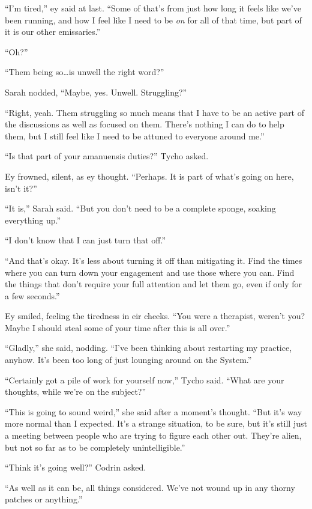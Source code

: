 ``I'm tired,'' ey said at last. ``Some of that's from just how long it feels like we've been running, and how I feel like I need to be \emph{on} for all of that time, but part of it is our other emissaries.''

``Oh?''

``Them being so\ldots is unwell the right word?''

Sarah nodded, ``Maybe, yes. Unwell. Struggling?''

``Right, yeah. Them struggling so much means that I have to be an active part of the discussions as well as focused on them. There's nothing I can do to help them, but I still feel like I need to be attuned to everyone around me.''

``Is that part of your amanuensis duties?'' Tycho asked.

Ey frowned, silent, as ey thought. ``Perhaps. It is part of what's going on here, isn't it?''

``It is,'' Sarah said. ``But you don't need to be a complete sponge, soaking everything up.''

``I don't know that I can just turn that off.''

``And that's okay. It's less about turning it off than mitigating it. Find the times where you can turn down your engagement and use those where you can. Find the things that don't require your full attention and let them go, even if only for a few seconds.''

Ey smiled, feeling the tiredness in eir cheeks. ``You were a therapist, weren't you? Maybe I should steal some of your time after this is all over.''

``Gladly,'' she said, nodding. ``I've been thinking about restarting my practice, anyhow. It's been too long of just lounging around on the System.''

``Certainly got a pile of work for yourself now,'' Tycho said. ``What are your thoughts, while we're on the subject?''

``This is going to sound weird,'' she said after a moment's thought. ``But it's way more normal than I expected. It's a strange situation, to be sure, but it's still just a meeting between people who are trying to figure each other out. They're alien, but not so far as to be completely unintelligible.''

``Think it's going well?'' Codrin asked.

``As well as it can be, all things considered. We've not wound up in any thorny patches or anything.''

